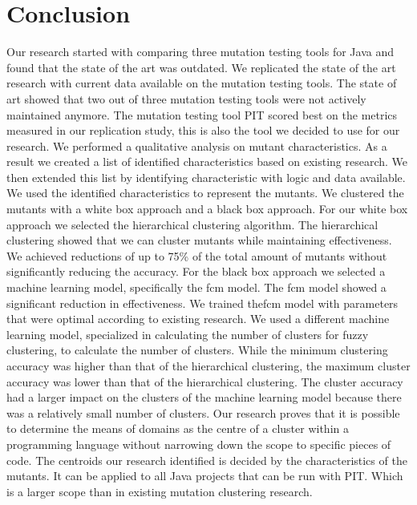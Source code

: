 \documentclass[../main]{subfiles}
\begin{document}
\chapter{Conclusion}
\label{ch:conclusion}
Our research started with comparing three mutation testing tools for Java and found that the state of the art was outdated.
We replicated the state of the art research with current data available on the mutation testing tools.
The state of art showed that two out of three mutation testing tools were not actively maintained anymore.
The mutation testing tool PIT scored best on the metrics measured in our replication study, this is also the tool we decided to use for our research.
\newline
We performed a qualitative analysis on mutant characteristics.
As a result we created a list of identified characteristics based on existing research. 
We then extended this list by identifying characteristic with logic and data available.
We used the identified characteristics to represent the mutants.
\newline
We clustered the mutants with a white box approach and a black box approach.
For our white box approach we selected the hierarchical clustering algorithm.
The hierarchical clustering showed that we can cluster mutants while maintaining effectiveness.
We achieved reductions of up to 75\% of the total amount of mutants without significantly reducing the accuracy.
\newline
For the black box approach we selected a machine learning model, specifically the \acrlong{fcm} model.
The \acrshort{fcm} model showed a significant reduction in effectiveness.
We trained the\acrshort{fcm} model with parameters that were optimal according to existing research. 
We used a different machine learning model, specialized in calculating the number of clusters for fuzzy clustering, to calculate the number of clusters.
While the minimum clustering accuracy was higher than that of the hierarchical clustering, the maximum cluster accuracy was lower than that of the hierarchical clustering.
The cluster accuracy had a larger impact on the clusters of the machine learning model because there was a relatively small number of clusters.
Our research proves that it is possible to determine the means of domains as the centre of a cluster within a programming language without narrowing down the scope to specific pieces of code.
The centroids our research identified is decided by the characteristics of the mutants.
It can be applied to all Java projects that can be run with PIT. 
Which is a larger scope than in existing mutation clustering research.
\end{document}
